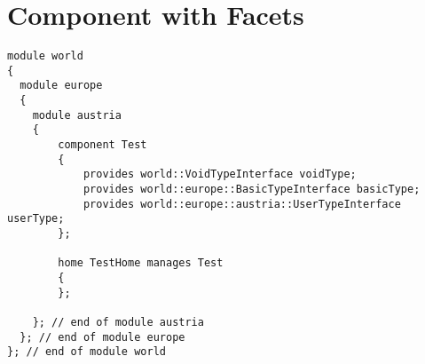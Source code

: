 \section{Component with Facets}
\begin{small}
\begin{verbatim}
module world 
{
  module europe 
  {
    module austria 
    {
        component Test
        {
            provides world::VoidTypeInterface voidType;
            provides world::europe::BasicTypeInterface basicType;
            provides world::europe::austria::UserTypeInterface userType;
        };
      
        home TestHome manages Test
        {
        };

    }; // end of module austria
  }; // end of module europe
}; // end of module world
\end{verbatim}
\end{small}
